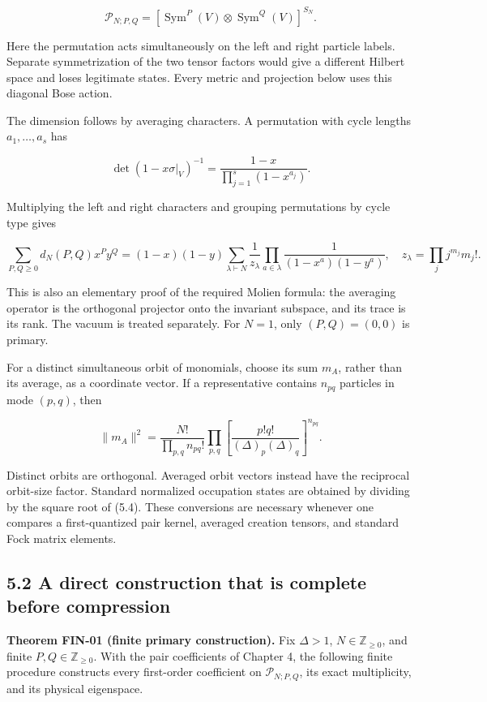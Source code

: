\documentclass[a4paper,11pt]{article}
\numberwithin{equation}{section}
\begin{document}
\[
\mathcal P_{N;P,Q}
=\left[\operatorname{Sym}^P(V)\otimes
\operatorname{Sym}^Q(V)\right]^{S_N}.
\tag{5.2}
\]

Here the permutation acts simultaneously on the left and right particle labels. Separate symmetrization of the two tensor factors would give a different Hilbert space and loses legitimate states. Every metric and projection below uses this diagonal Bose action.

The dimension follows by averaging characters. A permutation with cycle lengths \(a_1,\ldots,a_s\) has

\[
\det(1-x\sigma|_V)^{-1}
=\frac{1-x}{\prod_{j=1}^s(1-x^{a_j})}.
\]

Multiplying the left and right characters and grouping permutations by cycle type gives

\[
\sum_{P,Q\ge0}d_N(P,Q)x^Py^Q
=(1-x)(1-y)\sum_{\lambda\vdash N}
\frac1{z_\lambda}\prod_{a\in\lambda}
\frac1{(1-x^a)(1-y^a)},
\quad z_\lambda=\prod_j j^{m_j}m_j!.
\tag{5.3}
\]

This is also an elementary proof of the required Molien formula: the averaging operator is the orthogonal projector onto the invariant subspace, and its trace is its rank. The vacuum is treated separately. For \(N=1\), only \((P,Q)=(0,0)\) is primary.

For a distinct simultaneous orbit of monomials, choose its sum \(m_A\), rather than its average, as a coordinate vector. If a representative contains \(n_{pq}\) particles in mode \((p,q)\), then

\[
\|m_A\|^2=
\frac{N!}{\prod_{p,q}n_{pq}!}
\prod_{p,q}\left[\frac{p!q!}{(\Delta)_p(\Delta)_q}\right]^{n_{pq}}.
\tag{5.4}
\]

Distinct orbits are orthogonal. Averaged orbit vectors instead have the reciprocal orbit-size factor. Standard normalized occupation states are obtained by dividing by the square root of (5.4). These conversions are necessary whenever one compares a first-quantized pair kernel, averaged creation tensors, and standard Fock matrix elements.

\hypertarget{a-direct-construction-that-is-complete-before-compression}{%
\subsection{5.2 A direct construction that is complete before compression}\label{a-direct-construction-that-is-complete-before-compression}}

\textbf{Theorem FIN-01 (finite primary construction).} Fix \(\Delta>1\), \(N\in\mathbb Z_{\ge0}\), and finite \(P,Q\in\mathbb Z_{\ge0}\). With the pair coefficients of Chapter 4, the following finite procedure constructs every first-order coefficient on \(\mathcal P_{N;P,Q}\), its exact multiplicity, and its physical eigenspace.
\end{document}
